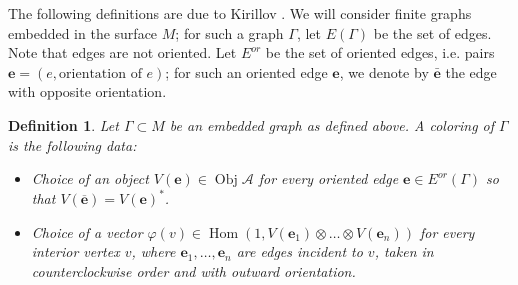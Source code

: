 \documentclass{amsart}
\newtheorem{defn}[thm]{Definition}
\DeclareMathOperator{\Hom}{Hom}
\DeclareMathOperator{\Obj}{Obj}
\begin{document}
\newcommand{\ee}{\mathbf{e}}       %
\newcommand{\Ga}{\Gamma}
\newcommand{\ph}{\varphi}
\newcommand{\A}{\mathcal{A}}      %
\newcommand{\st}{\; | \;}                               %
\newcommand{\ttt}{\otimes}                              %
\newcommand{\cc}[1]{\underset{\scriptstyle #1}{\circ}}
\newcommand{\ccc}[1]{\underset{\scriptstyle #1}{\bullet}}
\newcommand{\ti}{\tilde}
\newcommand{\ov}{\overline}
\newcommand{\del}{\partial}
\newcommand{\<}{\langle}
\renewcommand{\>}{\rangle}
\newcommand{\surjto}{\twoheadrightarrow}      %
\newcommand{\injto}{\hookrightarrow}          %
\newcommand{\isoto}{\xrightarrow{\sim}}       %
\newcommand{\xxto}{\xrightarrow}              %
\newcommand{\firef}[1]{Figure~{\rm\ref{#1}}}
\newcommand{\R}{\mathbb{R}}       %

The following definitions are due to Kirillov \cite{kirillovStringNets}.
We will consider finite  graphs embedded in the surface $M$; for such a
graph $\Ga$, let $E(\Ga)$ be the set of edges. Note that edges are not
oriented. Let $E^{or}$ be the set of oriented edges, i.e. pairs $\ee=(e,
\text{orientation of } e)$; for such an oriented edge $\ee$, we denote by
$\bar{\ee}$ the edge with opposite orientation.

\begin{defn}\label{d:coloring} Let  $\Ga \subset M$ be an embedded graph as
defined above.  A {\em coloring} of $\Ga$ is the
following data:

  \begin{itemize}
    \item Choice of an object $V(\ee)\in \Obj \A$ for every oriented edge
        $\ee\in E^{or}(\Ga)$ so that $V(\ov{\ee})=V(\ee)^*$.
    \item Choice of a vector $\ph(v)\in \Hom (1, V(\ee_1) \otimes \dots \otimes V(\ee_n))$  for    every interior vertex $v$, where 
      $\ee_1, \dots, \ee_n$ are edges incident to $v$, taken in counterclockwise 
      order and with outward orientation. 
\end{itemize}
\end{defn}
\end{document}
